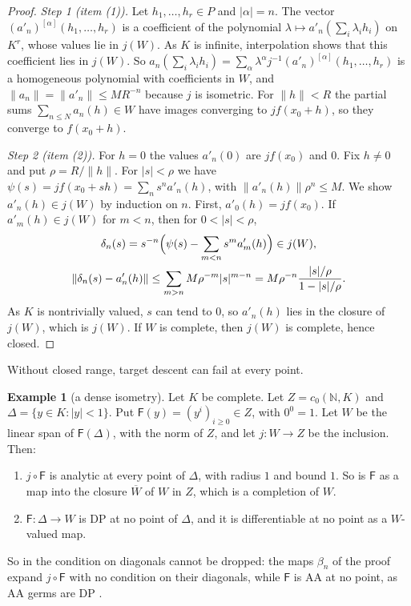 \documentclass[11pt]{amsart}
\theoremstyle{definition}
\theoremstyle{remark}
\numberwithin{equation}{section}
\newcommand{\N}{\mathbb N}
\newcommand{\abs}[1]{\lvert #1\rvert}
\newcommand{\norm}[1]{\lVert #1\rVert}
\theoremstyle{plain}
\theoremstyle{definition}
\newtheorem{example}[theorem]{Example}
\theoremstyle{plain}
\begin{document}
\begin{proof}
\emph{Step 1 (item (1)).} Let $h_1,\dots,h_r\in P$ and $\abs\alpha=n$. The vector $(a'_n)^{[\alpha]}(h_1,\dots,h_r)$ is a coefficient of the polynomial $\lambda\mapsto a'_n(\sum_i\lambda_ih_i)$ on $K^r$, whose values lie in $j(W)$. As $K$ is infinite, interpolation shows that this coefficient lies in $j(W)$. So $a_n(\sum_i\lambda_ih_i)=\sum_\alpha\lambda^\alpha j^{-1}(a'_n)^{[\alpha]}(h_1,\dots,h_r)$ is a homogeneous polynomial with coefficients in $W$, and $\norm{a_n}=\norm{a'_n}\le MR^{-n}$ because $j$ is isometric. For $\norm h<R$ the partial sums $\sum_{n\le N}a_n(h)\in W$ have images converging to $jf(x_0+h)$, so they converge to $f(x_0+h)$.

\emph{Step 2 (item (2)).} For $h=0$ the values $a'_n(0)$ are $jf(x_0)$ and $0$. Fix $h\ne0$ and put $\rho=R/\norm h$. For $\abs s<\rho$ we have $\psi(s)=jf(x_0+sh)=\sum_ns^na'_n(h)$, with $\norm{a'_n(h)}\rho^n\le M$. We show $a'_n(h)\in j(W)$ by induction on $n$. First, $a'_0(h)=jf(x_0)$. If $a'_m(h)\in j(W)$ for $m<n$, then for $0<\abs s<\rho$,
\begin{gather*}
 \delta_n(s)=s^{-n}\Bigl(\psi(s)-\sum_{m<n}s^ma'_m(h)\Bigr)\in j(W),\\
 \norm{\delta_n(s)-a'_n(h)}\le\sum_{m>n}M\rho^{-m}\abs s^{m-n}=M\rho^{-n}\frac{\abs s/\rho}{1-\abs s/\rho}.
\end{gather*}
As $K$ is nontrivially valued, $s$ can tend to $0$, so $a'_n(h)$ lies in the closure of $j(W)$, which is $j(W)$. If $W$ is complete, then $j(W)$ is complete, hence closed.
\end{proof}

Without closed range, target descent can fail at every point.

\begin{example}[a dense isometry]\label{dp:ex:dense-isometry}
Let $K$ be complete. Let $Z=c_0(\N,K)$ and $\Delta=\{y\in K:\abs y<1\}$. Put $\mathsf F(y)=(y^i)_{i\ge0}\in Z$, with $0^0=1$. Let $W$ be the linear span of $\mathsf F(\Delta)$, with the norm of $Z$, and let $j\colon W\to Z$ be the inclusion. Then:
\begin{enumerate}
\item $j\circ\mathsf F$ is analytic at every point of $\Delta$, with radius $1$ and bound $1$. So is $\mathsf F$ as a map into the closure $\overline W$ of $W$ in $Z$, which is a completion of $W$.
\item $\mathsf F\colon\Delta\to W$ is DP at no point of $\Delta$, and it is differentiable at no point as a $W$-valued map.
\end{enumerate}
So in \cite[Definition~14.7]{I} the condition on diagonals cannot be dropped: the maps $\beta_n$ of the proof expand $j\circ\mathsf F$ with no condition on their diagonals, while $\mathsf F$ is AA at no point, as AA germs are DP \cite[Proposition~14.9(1)]{I}.
\end{example}
\end{document}
